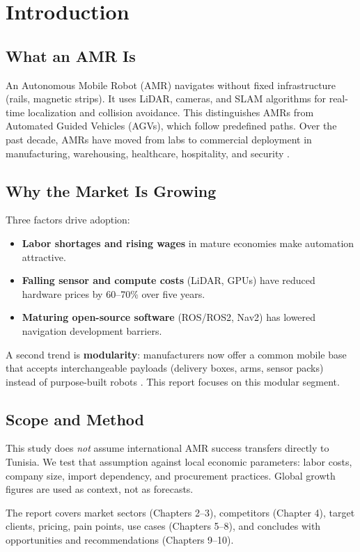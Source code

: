 \chapter{Introduction}

\section{What an AMR Is}

An Autonomous Mobile Robot (AMR) navigates without fixed infrastructure (rails, magnetic strips). It uses LiDAR, cameras, and SLAM algorithms for real-time localization and collision avoidance. This distinguishes AMRs from Automated Guided Vehicles (AGVs), which follow predefined paths. Over the past decade, AMRs have moved from labs to commercial deployment in manufacturing, warehousing, healthcare, hospitality, and security \cite{standardbots_amr,valuates_agv_amr}.

\section{Why the Market Is Growing}

Three factors drive adoption:
\begin{itemize}
    \item \textbf{Labor shortages and rising wages} in mature economies make automation attractive.
    \item \textbf{Falling sensor and compute costs} (LiDAR, GPUs) have reduced hardware prices by 60--70\% over five years.
    \item \textbf{Maturing open-source software} (ROS/ROS2, Nav2) has lowered navigation development barriers.
\end{itemize}

A second trend is \textbf{modularity}: manufacturers now offer a common mobile base that accepts interchangeable payloads (delivery boxes, arms, sensor packs) instead of purpose-built robots \cite{fdatabot_amr2026,robotnik_kairos}. This report focuses on this modular segment.

\section{Scope and Method}

This study does \emph{not} assume international AMR success transfers directly to Tunisia. We test that assumption against local economic parameters: labor costs, company size, import dependency, and procurement practices. Global growth figures are used as context, not as forecasts.

The report covers market sectors (Chapters 2--3), competitors (Chapter 4), target clients, pricing, pain points, use cases (Chapters 5--8), and concludes with opportunities and recommendations (Chapters 9--10).